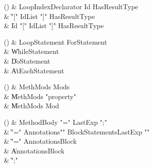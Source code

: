 \begin{bbgrammarappendix}

() & LoopIndexDeclarator \label{prod:LoopIndexDeclarator}  \: Id HasResultType\opt  \\

 &    \| \xcd"[" IdList \xcd"]" HasResultType\opt \\
 &    \| Id \xcd"[" IdList \xcd"]" HasResultType\opt \\

\end{bbgrammarappendix}

\begin{bbgrammarappendix}

() & LoopStatement \label{prod:LoopStatement}  \: ForStatement  \\

 &    \| WhileStatement \\
 &    \| DoStatement \\
 &    \| AtEachStatement \\

\end{bbgrammarappendix}

\begin{bbgrammarappendix}

() & MethMods \label{prod:MethMods}  \: Mods\opt  \\

 &    \| MethMods \xcd"property"  \\
 &    \| MethMods Mod \\

\end{bbgrammarappendix}

\begin{bbgrammarappendix}

() & MethodBody \label{prod:MethodBody}  \: \xcd"=" LastExp \xcd";"  \\

 &    \| \xcd"=" Annotations\opt \xcd"{" BlockStatements\opt LastExp \xcd"}" \\
 &    \| \xcd"=" Annotations\opt Block \\
 &    \| Annotations\opt Block \\
 &    \| \xcd";" \\

\end{bbgrammarappendix}

